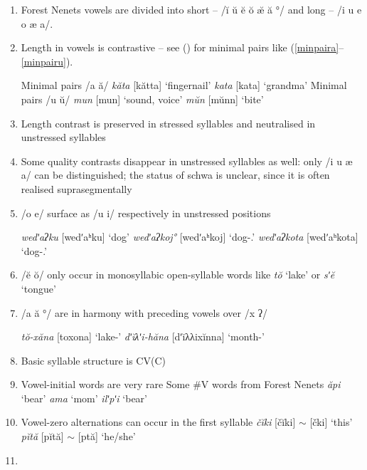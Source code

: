 \documentclass[a4paper, 12pt]{article}
\newcommand{\citeay}[2][]{
   \citeauthor{#2} (\citeyear[#1]{#2})}
\begin{document}
	\begin{enumerate}[$\gg$]
		\item Forest Nenets vowels are divided into short – /ĭ ŭ ĕ ŏ æ̆ ă °/ and long – /i u e o æ a/.
		\item Length in vowels is contrastive -- see \citeay{sammallahti1974} for minimal pairs like (\ref{minpaira}--\ref{minpairu}).
		
	\pex\label{minpaira}Minimal pairs /a ă/ \parencite[p. 20]{sammallahti1974}
		\a \emph{kăta} [kătta] \hfill `fingernail'
		\a \emph{kata} [kata] \hfill `grandma'
	\xe
	\pex\label{minpairu}Minimal pairs /u ŭ/
		\a \emph{mun} [mun] \hfill `sound, voice'
		\a \emph{mŭn} [mŭnn] \hfill `bite'
	\xe
	
		\item Length contrast is preserved in stressed syllables and neutralised in unstressed syllables
		\item Some quality contrasts disappear in unstressed syllables as well: only /i u æ a/ can be distinguished; the status of schwa is unclear, since it is often realised suprasegmentally
		\item /o e/ surface as /u i/ respectively in unstressed positions
		
	\pex\label{}\a \emph{wedʹaʔku} [wedʹaʰku] \hfill `dog'
		\a \emph{wedʹaʔkoj°} [wedʹaʰkoj] \hfill `dog-{\Poss}.{\Fsg}'
		\a \emph{wedʹaʔkota} [wedʹaʰkota] \hfill `dog-{\Poss}.{\Tsg}'
	\xe
		
		\item /ĕ ŏ/ only occur in monosyllabic open-syllable words like \emph{tŏ} `lake’ or \emph{sʹĕ} `tongue’
		\item /a ă °/ are in harmony with preceding vowels over /x ʔ/

	\pex\label{assim}
		\a \emph{tŏ-xăna} [toxona] \hfill `lake-{\Loc}' 
		\a \emph{dʹĭλʹi-hăna} [dʹĭλλixĭnna] \hfill `month-{\Loc}'
	\xe
		\item Basic syllable structure is CV(C)
		\item Vowel-initial words are very rare
			\pex Some \#V words from Forest Nenets
				\a \emph{ăpi} \hfill `bear'
				\a \emph{ama} \hfill `mom' 
				\a \emph{ilʹpʹi} \hfill `bear'
			\xe
		\item Vowel-zero alternations can occur in the first syllable
			\pex
				\a \emph{čĭki} [čĭki] $\sim$ [čki] \hfill `this'
				\a \emph{pĭtă} [pĭtă] $\sim$ [ptă] \hfill `he/she'
			\xe
		\item 
	\end{enumerate}
\end{document}
